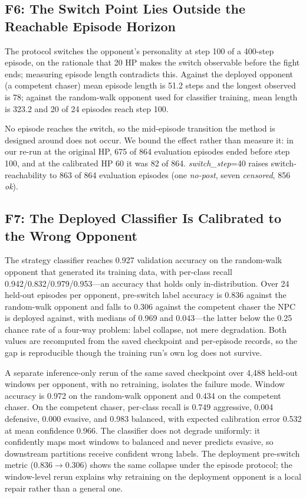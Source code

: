 \documentclass[conference,9pt]{IEEEtran}
\begin{document}
\subsection{F6: The Switch Point Lies Outside the Reachable Episode Horizon}

The protocol switches the opponent's personality at step 100 of a 400-step episode, on the rationale that 20 HP makes the switch observable before the fight ends; measuring episode length contradicts this. Against the deployed opponent (a competent chaser) mean episode length is 51.2 steps and the longest observed is 78; against the random-walk opponent used for classifier training, mean length is 323.2 and 20 of 24 episodes reach step 100.

No episode reaches the switch, so the mid-episode transition the method is designed around does not occur. We bound the effect rather than measure it: in our re-run at the original HP, 675 of 864 evaluation episodes ended before step 100, and at the calibrated HP 60 it was 82 of 864. \textit{switch\_step}=40 raises switch-reachability to 863 of 864 evaluation episodes (one \textit{no-post}, seven \textit{censored}, 856 \textit{ok}).

\subsection{F7: The Deployed Classifier Is Calibrated to the Wrong Opponent}

The strategy classifier reaches 0.927 validation accuracy on the random-walk opponent that generated its training data, with per-class recall 0.942/0.832/0.979/0.953---an accuracy that holds only in-distribution. Over 24 held-out episodes per opponent, pre-switch label accuracy is 0.836 against the random-walk opponent and falls to 0.306 against the competent chaser the NPC is deployed against, with medians of 0.969 and 0.043---the latter below the 0.25 chance rate of a four-way problem: label collapse, not mere degradation. Both values are recomputed from the saved checkpoint and per-episode records, so the gap is reproducible though the training run's own log does not survive.

A separate inference-only rerun of the same saved checkpoint over 4,488 held-out windows per opponent, with no retraining, isolates the failure mode. Window accuracy is 0.972 on the random-walk opponent and 0.434 on the competent chaser. On the competent chaser, per-class recall is 0.749 aggressive, 0.004 defensive, 0.000 evasive, and 0.983 balanced, with expected calibration error 0.532 at mean confidence 0.966. The classifier does not degrade uniformly: it confidently maps most windows to balanced and never predicts evasive, so downstream partitions receive confident wrong labels. The deployment pre-switch metric (0.836$\rightarrow$0.306) shows the same collapse under the episode protocol; the window-level rerun explains why retraining on the deployment opponent is a local repair rather than a general one.
\end{document}
